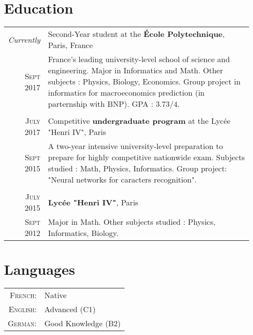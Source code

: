 \documentclass[a4paper,10pt]{article} %
\begin{document}

\section{Education}

\begin{tabularx}{\linewidth}{r|X}
\emph{Currently} & Second-Year student at the \textbf{École Polytechnique}, Paris, France \\
\textsc{Sept} 2017 & \small{France’s leading university-level school of science and engineering.
Major in Informatics and Math. Other subjects : Physics, Biology, Economics.
Group project in informatics for macroeconomics prediction (in parternship with BNP).
GPA : $3.73/4$.}
\\ & \\

\textsc{July 2017} & Competitive \textbf{undergraduate program} at the Lycée "Henri IV", Paris\\
\textsc{Sept 2015} & \small{A two-year intensive university-level preparation
to prepare for highly competitive nationwide exam.
Subjects studied : Math, Physics, Informatics. Group project: "Neural networks for caracters recognition".}
\\&\\

\textsc{July 2015} & \textbf{Lycée "Henri IV"}, Paris\\
\textsc{Sept 2012} & \small{Major in Math. Other subjects studied : Physics, Informatics, Biology.}
\end{tabularx}


\section{Languages}

\begin{tabular}{rl}
  \textsc{French:} & Native \\
  \textsc{English:} & Advanced (C1)\\
  \textsc{German:} & Good Knowledge (B2)\\
\end{tabular}
\end{document}
